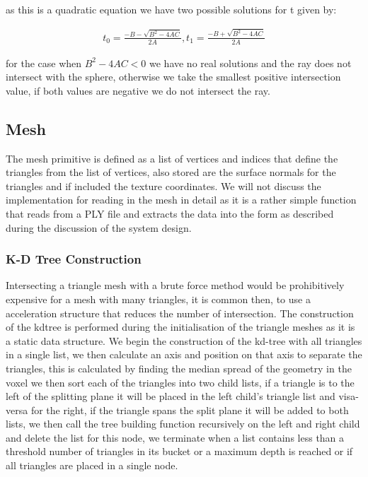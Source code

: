 as this is a quadratic equation we have two possible solutions for t given by:

\begin{align*}
t_0 = \frac{- B - \sqrt{B^2 - 4AC}}{2A}
,
t_1 = \frac{- B + \sqrt{B^2 - 4AC}}{2A}
\end{align*}

for the case when $B^2 - 4AC < 0$ we have no real solutions and the ray does not intersect with the sphere, otherwise we
take the smallest positive intersection value, if both values are negative we do not intersect the ray.

\subsection{Mesh}
The mesh primitive is defined as a list of vertices and indices that define the triangles from the list of vertices, also
stored are the surface normals for the triangles and if included the texture coordinates. We will not discuss the implementation
for reading in the mesh in detail as it is a rather simple function that reads from a PLY file and extracts the data into the
form as described during the discussion of the system design.

\subsubsection{K-D Tree Construction}
\label{sec:obj_mesh}
Intersecting a triangle mesh with a brute force method would be prohibitively expensive for a mesh with many triangles, it
is common then, to use a acceleration structure that reduces the number of intersection. The
construction of the kdtree is performed during the initialisation of the triangle meshes as it is a static data structure.
We begin the construction of the kd-tree with all
triangles in a single list, we then calculate an axis and position on that axis to separate the triangles, this is calculated
by finding the median spread of the geometry in the voxel we then sort each of the triangles into two child lists, if a triangle is
to the left of the splitting plane it will be placed in the left child's triangle list and visa-versa for the right, if the
triangle spans the split plane it will be added to both lists, we then call the tree building function recursively on the
left and right child and delete the list for this node, we terminate when a list contains less than a threshold number
of triangles in its bucket or a maximum depth is reached or if all triangles are placed in a single node.

